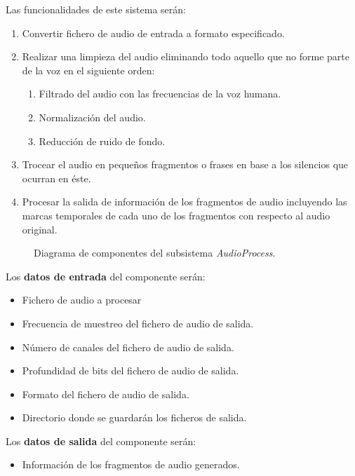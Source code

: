 \documentclass[../main.tex]{subfiles}
\begin{document}
Las funcionalidades de este sistema serán:
\begin{enumerate}
    \item Convertir fichero de audio de entrada a formato especificado.
    \item Realizar una limpieza del audio eliminando todo aquello que no forme parte de la voz en el siguiente orden:
    \begin{enumerate}[label=\theenumi.\arabic*]
        \item Filtrado del audio con las frecuencias de la voz humana.
        \item Normalización del audio.
        \item Reducción de ruido de fondo.
    \end{enumerate}
    \item Trocear el audio en pequeños fragmentos o frases en base a los silencios que ocurran en éste.
    \item Procesar la salida de información de los fragmentos de audio incluyendo las marcas temporales de cada uno de los fragmentos con respecto al audio original.
\end{enumerate}

\begin{figure}[H]
    \centering
    
    \label{fig:components_audioprocess}
    \caption{Diagrama de componentes del subsistema \textit{AudioProcess}.}
\end{figure}

Los \textbf{datos de entrada} del componente serán:
\begin{itemize}
    \item Fichero de audio a procesar
    \item Frecuencia de muestreo del fichero de audio de salida.    
    \item Número de canales del fichero de audio de salida.
    \item Profundidad de bits del fichero de audio de salida.
    \item Formato del fichero de audio de salida.
    \item Directorio donde se guardarán los ficheros de salida.
\end{itemize}

Los \textbf{datos de salida} del componente serán:
\begin{itemize}
    \item Información de los fragmentos de audio generados.
\end{itemize}
\end{document}

